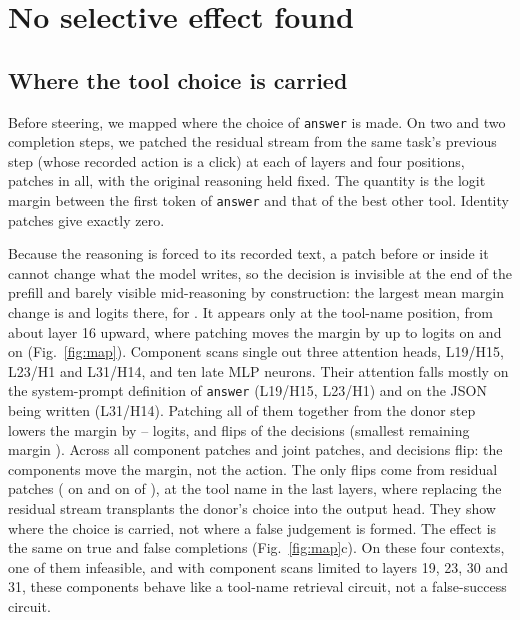 \section{No selective effect found}
\label{sec:causal-results}

\subsection{Where the tool choice is carried}
\label{sec:map}
Before steering, we mapped where the choice of \texttt{answer} is made. On two \fsp{} and two \fsm{} completion steps, we patched the residual stream from the same task's previous step (whose recorded action is a click) at each of \cfgBigLayers{} layers and four positions, \cmProbes{} patches in all, with the original reasoning held fixed. The quantity is the logit margin between the first token of \texttt{answer} and that of the best other tool. Identity patches give exactly zero.

Because the reasoning is forced to its recorded text, a patch before or inside it cannot change what the model writes, so the decision is invisible at the end of the prefill and barely visible mid-reasoning by construction: the largest mean margin change is \cmPrefillPos{} and \cmMidPos{} logits there, for \fsp. It appears only at the tool-name position, from about layer 16 upward, where patching moves the margin by up to \cmMinPos{} logits on \fsp{} and \cmMinNeg{} on \fsm{} (Fig.~\ref{fig:map}). Component scans single out three attention heads, L19/H15, L23/H1 and L31/H14, and ten late MLP neurons. Their attention falls mostly on the system-prompt definition of \texttt{answer} (L19/H15, L23/H1) and on the JSON being written (L31/H14). %
Patching all of them together from the donor step lowers the margin by \cjDeltaMin--\cjDeltaMax{} logits, and flips \cjFlips{} of the \cjN{} decisions (smallest remaining margin \cjMarginMin). Across all \cmCompProbes{} component patches and \cjAll{} joint patches, \cmCompFlips{} and \cjAllFlips{} decisions flip: the components move the margin, not the action. The only flips come from residual patches (\cmFlipsPos{} on \fsp{} and \cmFlipsNeg{} on \fsm{} of \cmProbes), at the tool name in the last layers, where replacing the residual stream transplants the donor's choice into the output head. They show where the choice is carried, not where a false judgement is formed. %
 The effect is the same on true and false completions (Fig.~\ref{fig:map}c). On these four contexts, one of them infeasible, and with component scans limited to layers 19, 23, 30 and 31, these components behave like a tool-name retrieval circuit, not a false-success circuit. %

